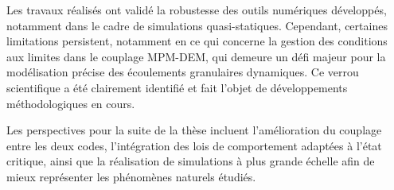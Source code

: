 \documentclass[a4paper,12pt]{report}
\begin{document}
Les travaux réalisés ont validé la robustesse des outils numériques développés, notamment dans le cadre de simulations quasi-statiques. Cependant, certaines limitations persistent, notamment en ce qui concerne la gestion des conditions aux limites dans le couplage MPM-DEM, qui demeure un défi majeur pour la modélisation précise des écoulements granulaires dynamiques. Ce verrou scientifique a été clairement identifié et fait l’objet de développements méthodologiques en cours.

Les perspectives pour la suite de la thèse incluent l’amélioration du couplage entre les deux codes, l’intégration des lois de comportement adaptées à l’état critique, ainsi que la réalisation de simulations à plus grande échelle afin de mieux représenter les phénomènes naturels étudiés.




\end{document}
